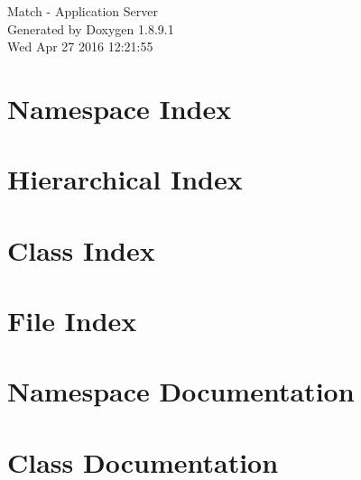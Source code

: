\documentclass[twoside]{book}
\newcommand{\+}{\discretionary{\mbox{\scriptsize$\hookleftarrow$}}{}{}}
\newcommand{\clearemptydoublepage}{%
  \newpage{\pagestyle{empty}\cleardoublepage}%
}
\begin{document}
\hypersetup{pageanchor=false,
             bookmarks=true,
             bookmarksnumbered=true,
             pdfencoding=unicode
            }
\begin{titlepage}
\vspace*{7cm}
\begin{center}%
{\Large Match -\/ Application Server }\\
\vspace*{1cm}
{\large Generated by Doxygen 1.8.9.1}\\
\vspace*{0.5cm}
{\small Wed Apr 27 2016 12:21:55}\\
\end{center}
\end{titlepage}
\clearemptydoublepage
\tableofcontents
\clearemptydoublepage
{}
\hypersetup{pageanchor=true}

\chapter{Namespace Index}

\chapter{Hierarchical Index}

\chapter{Class Index}

\chapter{File Index}

\chapter{Namespace Documentation}


\chapter{Class Documentation}













\end{document}
